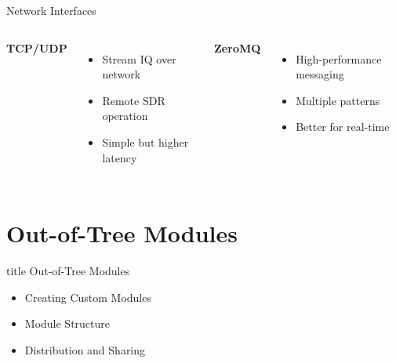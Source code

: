 \documentclass[aspectratio=169,11pt]{beamer}
\begin{document}
\begin{frame}{Network Interfaces}
\begin{columns}
\textbf{TCP/UDP}
\begin{itemize}
    \item Stream IQ over network
    \item Remote SDR operation
    \item Simple but higher latency
\end{itemize}

\textbf{ZeroMQ}
\begin{itemize}
    \item High-performance messaging
    \item Multiple patterns
    \item Better for real-time
\end{itemize}
\end{columns}
\end{frame}

\section{Out-of-Tree Modules}

\begin{frame}[plain]
\vfill
\centering
\begin{beamercolorbox}[sep=8pt,center,shadow=true,rounded=true]{title}
\Large Out-of-Tree Modules\par
\end{beamercolorbox}
\vfill
\begin{itemize}
    \item Creating Custom Modules
    \item Module Structure
    \item Distribution and Sharing
\end{itemize}
\vfill
\end{frame}
\end{document}
